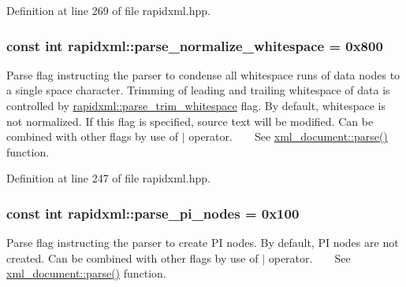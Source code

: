 Definition at line 269 of file rapidxml.\+hpp.

\subsubsection[{\texorpdfstring{parse\+\_\+normalize\+\_\+whitespace}{parse_normalize_whitespace}}]{\setlength{\rightskip}{0pt plus 5cm}const int rapidxml\+::parse\+\_\+normalize\+\_\+whitespace = 0x800}\hypertarget{namespacerapidxml_a31f33885defb5176a7d99e524c35d386}{}\label{namespacerapidxml_a31f33885defb5176a7d99e524c35d386}
Parse flag instructing the parser to condense all whitespace runs of data nodes to a single space character. Trimming of leading and trailing whitespace of data is controlled by \hyperlink{namespacerapidxml_a61912424b47db5038e726d4e1c22417f}{rapidxml\+::parse\+\_\+trim\+\_\+whitespace} flag. By default, whitespace is not normalized. If this flag is specified, source text will be modified. Can be combined with other flags by use of $\vert$ operator. ~\newline
~\newline
 See \hyperlink{classrapidxml_1_1xml__document_ac6e73ff9ac323bf5a370c38feb03a6b1}{xml\+\_\+document\+::parse()} function. 

Definition at line 247 of file rapidxml.\+hpp.

\subsubsection[{\texorpdfstring{parse\+\_\+pi\+\_\+nodes}{parse_pi_nodes}}]{\setlength{\rightskip}{0pt plus 5cm}const int rapidxml\+::parse\+\_\+pi\+\_\+nodes = 0x100}\hypertarget{namespacerapidxml_a03fe68fcf5d28f38476e0fd31adecc4c}{}\label{namespacerapidxml_a03fe68fcf5d28f38476e0fd31adecc4c}
Parse flag instructing the parser to create PI nodes. By default, PI nodes are not created. Can be combined with other flags by use of $\vert$ operator. ~\newline
~\newline
 See \hyperlink{classrapidxml_1_1xml__document_ac6e73ff9ac323bf5a370c38feb03a6b1}{xml\+\_\+document\+::parse()} function. 

